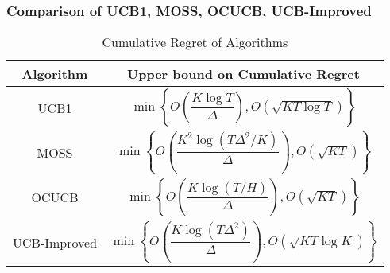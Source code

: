 \begin{frame}
\frametitle{Comparison of UCB1, MOSS, OCUCB, UCB-Improved}
\begin{table}
\caption{Cumulative Regret of Algorithms}
\begin{center}
\begin{tabular}{|c|c|}
\toprule
Algorithm  & Upper bound on Cumulative Regret\\
\midrule
UCB1        &$\min\left \lbrace O\left(\dfrac{K\log T}{\Delta} \right), O\left( \sqrt{KT\log T}\right) \right\rbrace$ \\\midrule
MOSS        &$\min\left \lbrace O\left(\dfrac{K^2\log (T\Delta^2/K)}{\Delta} \right), O\left( \sqrt{KT}\right) \right\rbrace$ \\\midrule
OCUCB        &$\min\left \lbrace O\left(\dfrac{K\log (T/H)}{\Delta} \right), O\left( \sqrt{KT}\right) \right\rbrace$ \\\midrule
UCB-Improved      &$\min\left \lbrace O\left(\dfrac{K\log (T\Delta^2)}{\Delta} \right), O\left( \sqrt{KT\log K}\right) \right\rbrace$\\\bottomrule
\end{tabular}
\end{center}
\end{table}
\end{frame}


